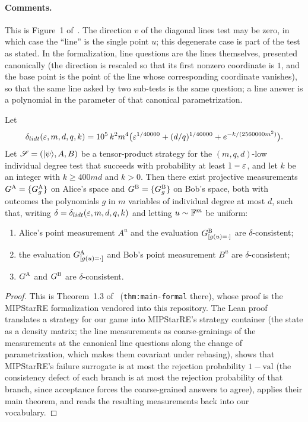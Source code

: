 \paragraph{Comments.} This is Figure~1 of~\cite{JNVWY21qld}. The direction $v$ of the
diagonal lines test may be zero, in which case the ``line'' is the single point $u$;
this degenerate case is part of the test as stated. In the formalization, line questions
are the lines themselves, presented canonically (the direction is rescaled so that its
first nonzero coordinate is $1$, and the base point is the point of the line whose
corresponding coordinate vanishes), so that the same line asked by two sub-tests is the
same question; a line answer is a polynomial in the parameter of that canonical
parametrization.

\begin{theorem}
\label{thm:lidt-soundness}
\leanok
Let
\begin{equation*}
  \delta_{lidt}(\varepsilon, m, d, q, k)
  = 10^5 \, k^2 m^4 \bigl( \varepsilon^{1/40000} + (d/q)^{1/40000}
      + e^{-k/(2560000 m^2)} \bigr).
\end{equation*}
Let $\mathscr{S} = (|\psi\rangle, A, B)$ be a tensor-product strategy for the
$(m,q,d)$-low individual degree test that succeeds with probability at least $1 - \varepsilon$,
and let $k$ be an integer with $k \geq 400md$ and $k > 0$. Then there exist projective
measurements $G^{\textsc{A}} = \{G^{\textsc{A}}_g\}$ on Alice's space and $G^{\textsc{B}} = \{G^{\textsc{B}}_g\}$ on
Bob's space, both with outcomes the polynomials $g$ in $m$ variables of individual degree
at most $d$, such that, writing $\delta = \delta_{lidt}(\varepsilon, m, d, q, k)$ and letting
$u \sim \mathbb{F}^m$ be uniform:
\begin{enumerate}
\item Alice's point measurement $A^u$ and the evaluation $G^{\textsc{B}}_{[g(u) = \cdot]}$
  are $\delta$-consistent;
\item the evaluation $G^{\textsc{A}}_{[g(u) = \cdot]}$ and Bob's point measurement $B^u$
  are $\delta$-consistent;
\item $G^{\textsc{A}}$ and $G^{\textsc{B}}$ are $\delta$-consistent.
\end{enumerate}
\end{theorem}
\begin{proof}
\leanok
This is Theorem~1.3 of~\cite{JNVWY21qld} (\texttt{thm:main-formal} there), whose proof
is the MIPStarRE formalization vendored into this repository. The Lean proof translates
a strategy for our game into MIPStarRE's strategy container (the state as a density
matrix; the line measurements as coarse-grainings of the measurements at the canonical
line questions along the change of parametrization, which makes them covariant under
rebasing), shows that MIPStarRE's failure surrogate is at most the rejection probability
$1 - \mathrm{val}$ (the consistency defect of each branch is at most the rejection
probability of that branch, since acceptance forces the coarse-grained answers to
agree), applies their main theorem, and reads the resulting measurements back into our
vocabulary.
\end{proof}

